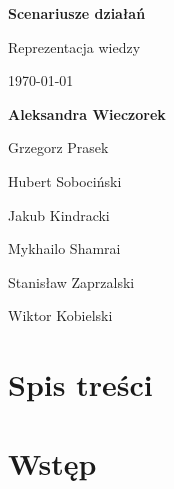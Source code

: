 \documentclass[12pt,a4paper]{article}
\begin{document}
\begin{titlepage}
    \thispagestyle{empty}
    \begin{center}
        \vspace*{3.2cm}

        {\fontsize{26}{31}\selectfont\bfseries Scenariusze działań\par}
        \vspace{1.2cm}
        {\fontsize{18}{22}\selectfont Reprezentacja wiedzy\par}

        \vspace{2.8cm}
        {\fontsize{16}{20}\selectfont \today \par}

        \vfill

        {\fontsize{15}{10}\selectfont\bfseries Aleksandra Wieczorek\par}
        \vspace{0.3cm}
        {\fontsize{12}{10}\selectfont Grzegorz Prasek\par}
        \vspace{0.3cm}
        {\fontsize{12}{10}\selectfont Hubert Sobociński\par}
        \vspace{0.3cm}
        {\fontsize{12}{10}\selectfont Jakub Kindracki\par}
        \vspace{0.3cm}
        {\fontsize{12}{10}\selectfont Mykhailo Shamrai\par}
        \vspace{0.3cm}
        {\fontsize{12}{10}\selectfont Stanisław Zaprzalski\par}
        \vspace{0.3cm}
        {\fontsize{12}{10}\selectfont Wiktor Kobielski\par}

    \end{center}
\end{titlepage}

\clearpage
{}
\setcounter{page}{1}

\makeatletter
{\raggedright
\section*{Spis treści}
\par}
\makeatother

\clearpage

\section{Wstęp}
\end{document}
